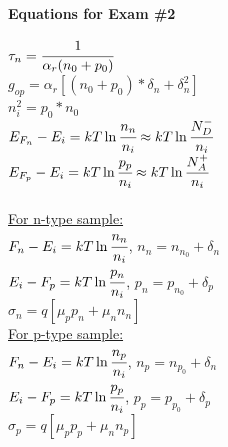 \documentclass[12pt]{article}
\begin{document}
	\noindent\begin{center}\textbf{Equations for Exam \#2}\end{center}
	\begin{small}
		\begin{multicols*}{2}
			\noindent $\tau_n = \cfrac{1}{\alpha_r (n_0+p_0)}$ \\
			$g_{op} = \alpha_r \left[(n_0+p_0)*\delta_n + \delta_n^2\right]$ \\
			$n_i^2 = p_0 * n_0$\\
			$E_{F_n}-E_i = kT \ln \cfrac{n_n}{n_i} \approx kT \ln \cfrac{N_D^-}{n_i}$\\
			$E_{F_p}-E_i = kT \ln \cfrac{p_p}{n_i} \approx kT \ln \cfrac{N_A^+}{n_i}$\\\\
			
			\noindent\underline{For n-type sample:}\\
			$F_n-E_i=kT \ln \cfrac{n_n}{n_i}$, $n_n = n_{n_0} + \delta_n$ \\ 
			$E_i-F_p=kT \ln \cfrac{p_n}{n_i}$, $p_n = p_{n_0} + \delta_p$ \\ 
			$\sigma_n = q \left[\mu_pp_n+\mu_nn_n\right]$\\
			\underline{For p-type sample:}\\
			$F_n-E_i=kT \ln \cfrac{n_p}{n_i}$, $n_p = n_{p_0} + \delta_n$ \\ 
			$E_i-F_p=kT \ln \cfrac{p_p}{n_i}$, $p_p = p_{p_0} + \delta_p$ \\ 
			$\sigma_p = q \left[\mu_pp_p+\mu_nn_p\right]$\\\\
			

\end{multicols*}
\end{small}
\end{document}
